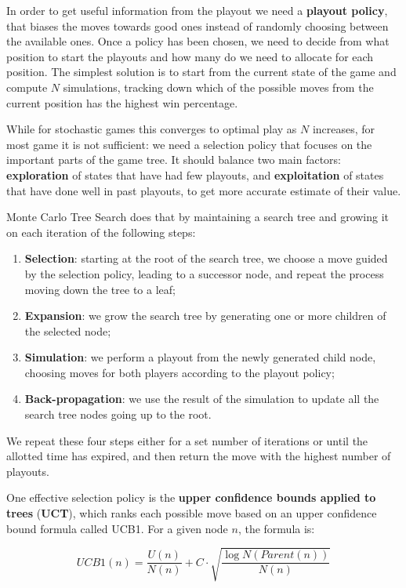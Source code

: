 \documentclass{article}
\begin{document}
In order to get useful information from the playout we need a \textbf{playout policy}, that biases the moves towards good ones instead of randomly choosing between the available ones. Once a policy has been chosen, we need to decide from what position to start the playouts and how many do we need to allocate for each position. The simplest solution is to start from the current state of the game and compute $N$ simulations, tracking down which of the possible moves from the current position has the highest win percentage.

While for stochastic games this converges to optimal play as $N$ increases, for most game it is not sufficient: we need a selection policy that focuses on the important parts of the game tree. It should balance two main factors: \textbf{exploration} of states that have had few playouts, and \textbf{exploitation} of states that have done well in past playouts, to get more accurate estimate of their value.

Monte Carlo Tree Search does that by maintaining a search tree and growing it on each iteration of the following steps:
\begin{enumerate}
    \item \textbf{Selection}: starting at the root of the search tree, we choose a move guided by the selection policy, leading to a successor node, and repeat the process moving down the tree to a leaf;
    \item \textbf{Expansion}: we grow the search tree by generating one or more children of the selected node;
    \item \textbf{Simulation}: we perform a playout from the newly generated child node, choosing moves for both players according to the playout policy;
    \item \textbf{Back-propagation}: we use the result of the simulation to update all the search tree nodes going up to the root.
\end{enumerate}

We repeat these four steps either for a set number of iterations or until the allotted time has expired, and then return the move with the highest number of playouts.

One effective selection policy is the \textbf{upper confidence bounds applied to trees} (\textbf{UCT}), which ranks each possible move based on an upper confidence bound formula called UCB1. For a given node $n$, the formula is:

\[UCB1(n) = \frac{U(n)}{N(n)}+C\cdot\sqrt{\frac{\log{N(Parent(n))}}{N(n)}}\]
\end{document}
